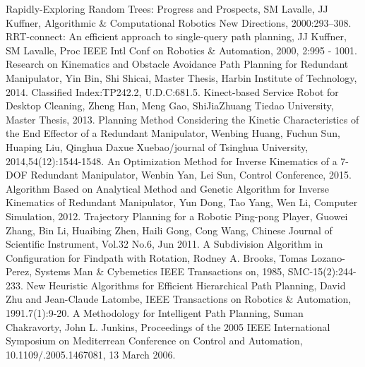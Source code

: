 \documentclass[letterpaper, 10 pt, conference]{ieeeconf}  %
\begin{document}
\begin{thebibliography}{99}

 Rapidly-Exploring Random Trees: Progress and Prospects, SM Lavalle, JJ Kuffner, Algorithmic \& Computational Robotics New Directions, 2000:293--308.
 RRT-connect: An efficient approach to single-query path planning, JJ Kuffner, SM Lavalle, Proc IEEE Intl Conf on Robotics \& Automation, 2000, 2:995 - 1001.
 Research on Kinematics and Obstacle Avoidance Path Planning for Redundant Manipulator, Yin Bin, Shi Shicai, Master Thesis, Harbin Institute of Technology, 2014. Classified Index:TP242.2, U.D.C:681.5.	
 Kinect-based Service Robot for Desktop Cleaning, Zheng Han, Meng Gao, ShiJiaZhuang Tiedao University, Master Thesis, 2013.
 Planning Method Considering the Kinetic Characteristics of the End Effector of a Redundant Manipulator, Wenbing Huang, Fuchun Sun, Huaping Liu, Qinghua Daxue Xuebao/journal of Tsinghua University, 2014,54(12):1544-1548.
 An Optimization Method for Inverse Kinematics of a 7-DOF Redundant Manipulator, Wenbin Yan, Lei Sun, Control Conference, 2015.
 Algorithm Based on Analytical Method and Genetic Algorithm for Inverse Kinematics of Redundant Manipulator, Yun Dong, Tao Yang, Wen Li, Computer Simulation, 2012.
 Trajectory Planning for a Robotic Ping-pong Player, Guowei Zhang, Bin Li, Huaibing Zhen, Haili Gong, Cong Wang, Chinese Journal of Scientific Instrument, Vol.32 No.6, Jun 2011.
 A Subdivision Algorithm in Configuration for Findpath with Rotation, Rodney A. Brooks, Tomas Lozano-Perez, Systems Man \& Cybemetics IEEE Transactions on, 1985, SMC-15(2):244-233.
 New Heuristic Algorithms for Efficient Hierarchical Path Planning, David Zhu and Jean-Claude Latombe, IEEE Transactions on Robotics \& Automation, 1991.7(1):9-20.
 A Methodology for Intelligent Path Planning, Suman Chakravorty, John L. Junkins, Proceedings of the 2005 IEEE International Symposium on Mediterrean Conference on Control and Automation, 10.1109/.2005.1467081, 13 March 2006.

\end{thebibliography}
\end{document}
